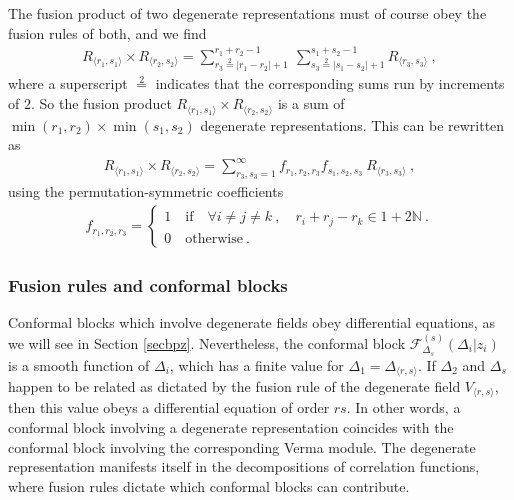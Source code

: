 \documentclass[12pt, a4paper, notitlepage, twoside]{report}
\numberwithin{equation}{section}
\theoremstyle{break}
\begin{document}
The fusion product of two degenerate representations must of course obey the fusion rules of both, and we find
\begin{align}
 \boxed{R_{\langle r_1,s_1 \rangle} \times R_{\langle r_2,s_2 \rangle} = \sum_{r_3\overset{2}{=}|r_1-r_2|+1}^{r_1+r_2-1}\ \sum_{s_3\overset{2}{=}|s_1-s_2|+1}^{s_1+s_2-1} R_{\langle r_3,s_3 \rangle}}\ ,
\label{rrsr}
\end{align}
where a superscript $\overset{2}{=}$ indicates that the corresponding sums run by increments of $2$.
So the fusion product $R_{\langle r_1,s_1 \rangle} \times R_{\langle r_2,s_2 \rangle}$ is a sum of $\min(r_1,r_2)\times \min(s_1,s_2)$ degenerate representations.
This can be rewritten as 
\begin{align}
R_{\langle r_1,s_1 \rangle} \times R_{\langle r_2,s_2 \rangle} = \sum_{r_3,s_3=1}^\infty f_{r_1,r_2,r_3} f_{s_1,s_2,s_3}\ R_{\langle r_3,s_3 \rangle}\ ,
 \label{rrrsss}
\end{align}
using the permutation-symmetric coefficients
\begin{align}
f_{r_1,r_2,r_3} = \left\{\begin{array}{l}  1 \quad \text{if} \quad 
 \forall i\neq j\neq k \ , \quad r_i+r_j-r_k \in 1 + 2{\mathbb{N}}\ .
\\ 0 \quad \text{otherwise} \ .\end{array}\right.  
\label{frrr}
\end{align}

\subsubsection{Fusion rules and conformal blocks}

Conformal blocks which involve degenerate fields obey differential equations, as we will see in Section \ref{secbpz}.
Nevertheless, the conformal block $\mathcal{F}^{(s)}_{\Delta_s}(\Delta_i|z_i)$ is a smooth function of $\Delta_i$, which has a finite value for $\Delta_1 = \Delta_{\langle r,s\rangle}$. 
If $\Delta_2$ and $\Delta_s$ happen to be related as dictated by the fusion rule of the degenerate field $V_{\langle r,s\rangle}$, then this value obeys a differential equation of order $rs$.
In other words, a conformal block involving a degenerate representation coincides with the conformal block involving the corresponding Verma module.
The degenerate representation manifests itself in the decompositions of correlation functions, where fusion rules dictate which conformal blocks can contribute.
\end{document}
